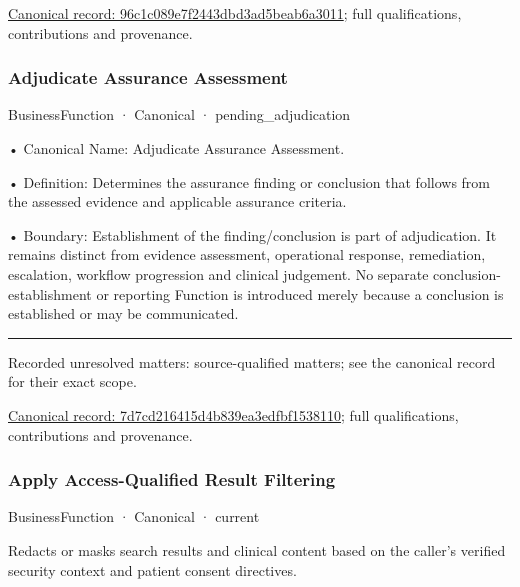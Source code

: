 {\footnotesize \href{../../../../continuum/business/business-function/96c1c089e7f2443dbd3ad5beab6a3011.md}{Canonical record: 96c1c089e7f2443dbd3ad5beab6a3011}; full qualifications, contributions and provenance.}\par
\subsubsection{Adjudicate Assurance Assessment}

\label{element:7d7cd216415d4b839ea3edfbf1538110}
{\small BusinessFunction · Canonical · pending\_adjudication}\par

•
Canonical Name: Adjudicate Assurance Assessment.



•
Definition: Determines the assurance finding or conclusion that follows from the assessed evidence and applicable assurance criteria.



•
Boundary: Establishment of the finding/conclusion is part of adjudication. It remains distinct from evidence assessment, operational response, remediation, escalation, workflow progression and clinical judgement. No separate conclusion-establishment or reporting Function is introduced merely because a conclusion is established or may be communicated.



\medskip\hrule\medskip

{\small Recorded unresolved matters: source-qualified matters; see the canonical record for their exact scope.}\par
{\footnotesize \href{../../../../continuum/business/business-function/7d7cd216415d4b839ea3edfbf1538110.md}{Canonical record: 7d7cd216415d4b839ea3edfbf1538110}; full qualifications, contributions and provenance.}\par
\subsubsection{Apply Access-Qualified Result Filtering}

\label{element:598e46ab52644e70809b3039b7a4c21e}
{\small BusinessFunction · Canonical · current}\par

Redacts or masks search results and clinical content based on the caller's verified security context and patient consent directives.



